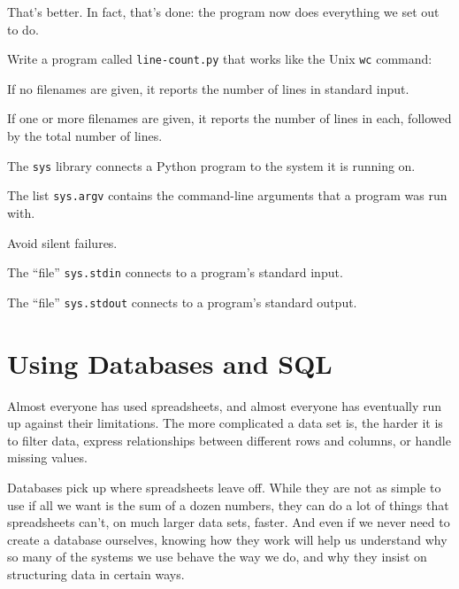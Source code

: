 \documentclass{book}
\begin{document}
That's better. In fact, that's done: the program now does everything we
set out to do.

\begin{challenge}
  Write a program called \texttt{line-count.py} that works like the Unix
  \texttt{wc} command:

  \begin{swcitemize}
  \item
    If no filenames are given, it reports the number of lines in
    standard input.
  \item
    If one or more filenames are given, it reports the number of lines
    in each, followed by the total number of lines.
   \end{swcitemize}
\end{challenge}

\begin{keypoints}
\begin{swcitemize}
\item
  The \texttt{sys} library connects a Python program to the system it is
  running on.
\item
  The list \texttt{sys.argv} contains the command-line arguments that a
  program was run with.
\item
  Avoid silent failures.
\item
  The ``file'' \texttt{sys.stdin} connects to a program's standard
  input.
\item
  The ``file'' \texttt{sys.stdout} connects to a program's standard
  output.
\end{swcitemize}
\end{keypoints}

\chapter{Using Databases and SQL}\label{s:sql}

Almost everyone has used spreadsheets, and almost everyone has
eventually run up against their limitations. The more complicated a data
set is, the harder it is to filter data, express relationships between
different rows and columns, or handle missing values.

Databases pick up where spreadsheets leave off. While they are not as
simple to use if all we want is the sum of a dozen numbers, they can do
a lot of things that spreadsheets can't, on much larger data sets,
faster. And even if we never need to create a database ourselves,
knowing how they work will help us understand why so many of the systems
we use behave the way we do, and why they insist on structuring data in
certain ways.
\end{document}
